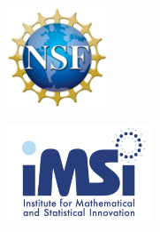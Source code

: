 \begin{center}

	    \begin{minipage}{0.2\textwidth}
		\centering
		\includegraphics[height=3cm]{Photos/nsf_logo.png}
	\end{minipage}
	\begin{minipage}{0.2\textwidth}
		\centering
		\includegraphics[height=3cm]{Photos/imsi_logo.png}
	\end{minipage} \\[1em]
	

\end{center}
